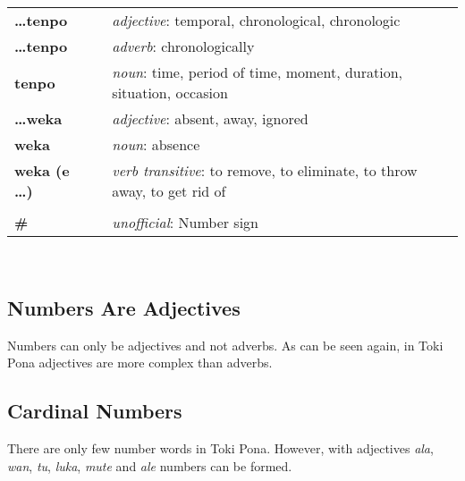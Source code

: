 \begin{supertabular}{p{2,5cm}|ll}
%
\textbf{\dots tenpo} && \textit{adjective}: temporal, chronological, chronologic \\ %
\textbf{\dots tenpo} && \textit{adverb}: chronologically \\ %
\textbf{tenpo} && \textit{noun}: time, period of time, moment, duration, situation, occasion \\ %
%
\textbf{\dots weka} && \textit{adjective}: absent, away, ignored \\ %
\textbf{weka} && \textit{noun}: absence \\ %
\textbf{weka (e \dots)} && \textit{verb transitive}: to remove, to eliminate, to throw away, to get rid of \\ %
 && \\ %
%
\index{\#}
\textbf{\#} && \textit{unofficial}: Number sign  \\ %
%
\end{supertabular} \\
%
%
%
\newpage
%
\subsection*{Numbers Are Adjectives}
%
%
Numbers can only be adjectives and not adverbs. 
As can be seen again, in Toki Pona adjectives are more complex than adverbs. 
%

\subsection*{Cardinal Numbers}
%
There are only few number words in Toki Pona.
However, with adjectives \textit{ala}, \textit{wan}, \textit{tu}, \textit{luka}, \textit{mute} and \textit{ale} numbers can be formed.

